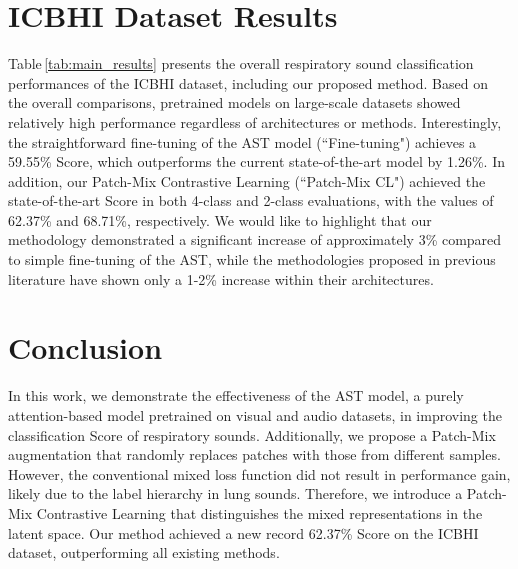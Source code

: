 \documentclass{INTERSPEECH2023}
\begin{document}
  

\vspace{-2pt}
\section{ICBHI Dataset Results}
\vspace{-1pt}











Table\,\ref{tab:main_results} presents the overall respiratory sound classification performances of the ICBHI dataset, including our proposed method. 
Based on the overall comparisons, pretrained models on large-scale datasets showed relatively high performance regardless of architectures or methods.
Interestingly, the straightforward fine-tuning of the AST model (``Fine-tuning") achieves a 59.55\% Score, which outperforms the current state-of-the-art model \cite{nguyen2022lung} by 1.26\%. 
In addition, our Patch-Mix Contrastive Learning (``Patch-Mix CL") achieved the state-of-the-art Score in both 4-class and 2-class evaluations, with the values of 62.37\% and 68.71\%, respectively.
We would like to highlight that our methodology demonstrated a significant increase of approximately 3\% compared to simple fine-tuning of the AST, while the methodologies proposed in previous literature have shown only a 1-2\% increase within their architectures. 
%
 

\vspace{-3pt}
\section{Conclusion}
\vspace{-1pt}


In this work, we demonstrate the effectiveness of the AST model, a purely attention-based model pretrained on visual and audio datasets, in improving the classification Score of respiratory sounds. 
Additionally, we propose a Patch-Mix augmentation that randomly replaces patches with those from different samples.
However, the conventional mixed loss function did not result in performance gain, likely due to the label hierarchy in lung sounds. Therefore, we introduce a Patch-Mix Contrastive Learning that distinguishes the mixed representations in the latent space.
Our method achieved a new record 62.37\% Score on the ICBHI dataset, outperforming all existing methods.
\end{document}
